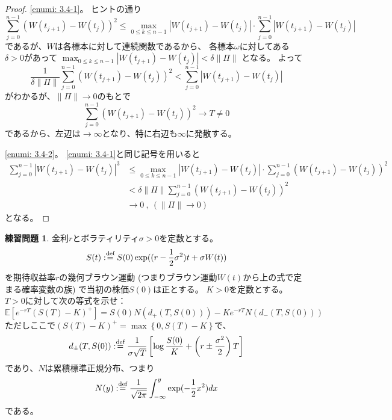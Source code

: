 \documentclass[uplatex]{jsarticle}
\theoremstyle{definition}
\newtheorem{prob}[prob]{練習問題}
\def\E{\mathbb{E}}
\def\dfn{:\overset{\mbox{{\scriptsize def}}}{=}}
\begin{document}
\begin{proof}
  \ref{enumi: 3.4-1}。
  ヒントの通り
  \[
  \sum_{j=0}^{n-1}(W(t_{j+1}) - W(t_j))^2
  \leq \max_{0\leq k \leq n-1}|W(t_{j+1}) - W(t_j)|\cdot
  \sum_{j=0}^{n-1}|W(t_{j+1}) - W(t_j)|
  \]
  であるが、\(W\)は各標本に対して連続関数であるから、
  各標本\(\omega\)に対してある\(\delta > 0\)があって
  \(\max_{0\leq k \leq n-1}|W(t_{j+1}) - W(t_j)| < \delta\|\Pi \|\)
  となる。
  よって
  \[
  \frac{1}{\delta\|\Pi \|}\sum_{j=0}^{n-1}(W(t_{j+1}) - W(t_j))^2
  < \sum_{j=0}^{n-1}|W(t_{j+1}) - W(t_j)|
  \]
  がわかるが、\(\|\Pi \|\to 0\)のもとで
  \[
  \sum_{j=0}^{n-1}(W(t_{j+1}) - W(t_j))^2  \to T\neq 0
  \]
  であるから、左辺は\(\to \infty\)となり、特に右辺も\(\infty\)に発散する。

  \ref{enumi: 3.4-2}。
  \ref{enumi: 3.4-1}と同じ記号を用いると
  \begin{align*}
    \sum_{j=0}^{n-1}|W(t_{j+1}) - W(t_j)|^3
    &\leq \max_{0\leq k \leq n-1}|W(t_{j+1}) - W(t_j)|\cdot
    \sum_{j=0}^{n-1}(W(t_{j+1}) - W(t_j))^2 \\
    &< \delta\|\Pi\|\sum_{j=0}^{n-1}(W(t_{j+1}) - W(t_j))^2 \\
    &\to 0 \ , \ (\|\Pi\| \to 0)
  \end{align*}
  となる。
\end{proof}





\begin{prob}\label{prob: 3.5}
  金利\(r\)とボラティリティ\(\sigma > 0\)を定数とする。
  \[
  S(t) \dfn S(0) \exp((r-\frac{1}{2}\sigma^2)t + \sigma W(t))
  \]
  を期待収益率\(r\)の幾何ブラウン運動
  (つまりブラウン運動\(W(t)\)から上の式で定まる確率変数の族)
  で当初の株価\(S(0)\)は正とする。
  \(K>0\)を定数とする。
  \(T>0\)に対して次の等式を示せ：
  \[
  \E\left[ e^{-rT}(S(T)-K)^+\right]
  = S(0)N(d_+(T,S(0))) - Ke^{-rT}N(d_-(T,S(0)))
  \]
  ただしここで\((S(T)-K)^+ = \max\left\{0,S(T)-K\right\}\)で、
  \[
  d_{\pm}(T,S(0)) \dfn \frac{1}{\sigma\sqrt{T}}
  \left[ \log\frac{S(0)}{K} + \left( r\pm\frac{\sigma^2}{2}\right)T\right]
  \]
  であり、\(N\)は累積標準正規分布、つまり
  \[
  N(y) \dfn \frac{1}{\sqrt{2\pi}}\int_{-\infty}^y\exp(-\frac{1}{2}x^2)dx
  \]
  である。
\end{prob}
\end{document}

